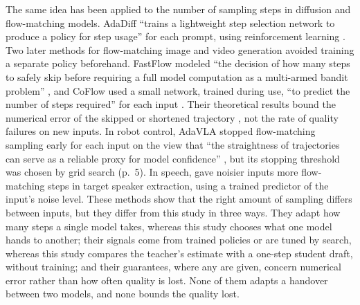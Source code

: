The same idea has been applied to the number of sampling steps in diffusion and flow-matching models. AdaDiff \enquote{trains a lightweight step selection network to produce a policy for step usage} for each prompt, using reinforcement learning \parencite[p.~2]{zhang2025adadiff}. Two later methods for flow-matching image and video generation avoided training a separate policy beforehand. FastFlow modeled \enquote{the decision of how many steps to safely skip before requiring a full model computation as a multi-armed bandit problem} \parencite[p.~1]{bajpai2026fastflow}, and CoFlow used a small network, trained during use, \enquote{to predict the number of steps required} for each input \parencite[p.~2]{bajpai2026coflow}. Their theoretical results bound the numerical error of the skipped or shortened trajectory \parencites[p.~4]{bajpai2026fastflow}{bajpai2026coflow}, not the rate of quality failures on new inputs. In robot control, AdaVLA stopped flow-matching sampling early for each input on the view that \enquote{the straightness of trajectories can serve as a reliable proxy for model confidence} \parencite[p.~3]{han2026adavla}, but its stopping threshold was chosen by grid search (p.~5). In speech, \textcite{hsieh2025adflowtse} gave noisier inputs more flow-matching steps in target speaker extraction, using a trained predictor of the input's noise level. These methods show that the right amount of sampling differs between inputs, but they differ from this study in three ways. They adapt how many steps a single model takes, whereas this study chooses what one model hands to another; their signals come from trained policies or are tuned by search, whereas this study compares the teacher's estimate with a one-step student draft, without training; and their guarantees, where any are given, concern numerical error rather than how often quality is lost. None of them adapts a handover between two models, and none bounds the quality lost.

